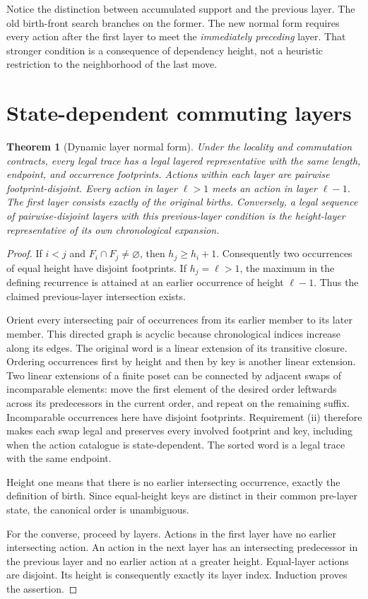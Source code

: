 \documentclass[11pt]{article}
\newtheorem{theorem}{Theorem}[section]
\theoremstyle{definition}
\begin{document}
Notice the distinction between accumulated support and the previous layer.
The old birth-front search branches on the former. The new normal form
requires every action after the first layer to meet the \emph{immediately
preceding} layer. That stronger condition is a consequence of dependency
height, not a heuristic restriction to the neighborhood of the last move.

\section{State-dependent commuting layers}
\label{sec:layers}

\begin{theorem}[Dynamic layer normal form]
\label{thm:foata}
Under the locality and commutation contracts, every legal trace has a legal
layered representative with the same length, endpoint, and occurrence
footprints. Actions within each layer are pairwise footprint-disjoint.
Every action in layer $\ell>1$ meets an action in layer $\ell-1$. The first
layer consists exactly of the original births. Conversely, a legal sequence
of pairwise-disjoint layers with this previous-layer condition is the
height-layer representative of its own chronological expansion.
\end{theorem}

\begin{proof}
If $i<j$ and $F_i\cap F_j\ne\varnothing$, then $h_j\ge h_i+1$.
Consequently two occurrences of equal height have disjoint footprints.
If $h_j=\ell>1$, the maximum in the defining recurrence is attained at an
earlier occurrence of height $\ell-1$. Thus the claimed previous-layer
intersection exists.

Orient every intersecting pair of occurrences from its earlier member to
its later member. This directed graph is acyclic because chronological
indices increase along its edges. The original word is a linear extension
of its transitive closure. Ordering occurrences first by height and then by
key is another linear extension. Two linear extensions of a finite poset
can be connected by adjacent swaps of incomparable elements: move the first
element of the desired order leftwards across its predecessors in the
current order, and repeat on the remaining suffix. Incomparable occurrences
here have disjoint footprints. Requirement (ii) therefore makes each swap
legal and preserves every involved footprint and key, including when the
action catalogue is state-dependent. The sorted word is a legal trace with
the same endpoint.

Height one means that there is no earlier intersecting occurrence, exactly
the definition of birth. Since equal-height keys are distinct in their
common pre-layer state, the canonical order is unambiguous.

For the converse, proceed by layers. Actions in the first layer have no
earlier intersecting action. An action in the next layer has an intersecting
predecessor in the previous layer and no earlier action at a greater
height. Equal-layer actions are disjoint. Its height is consequently exactly
its layer index. Induction proves the assertion.
\end{proof}
\end{document}
